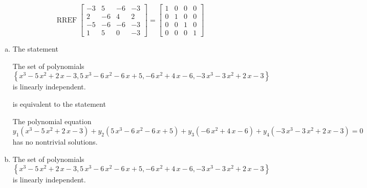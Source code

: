 \begin{exerciseAnswer} 


\[\operatorname{RREF} \left[\begin{array}{cccc}
-3 & 5 & -6 & -3 \\
2 & -6 & 4 & 2 \\
-5 & -6 & -6 & -3 \\
1 & 5 & 0 & -3
\end{array}\right] = \left[\begin{array}{cccc}
1 & 0 & 0 & 0 \\
0 & 1 & 0 & 0 \\
0 & 0 & 1 & 0 \\
0 & 0 & 0 & 1
\end{array}\right] \]


\begin{enumerate}[(a)]
\item The statement 
\begin{center}\begin{minipage}{0.8\textwidth}
 The set of polynomials \( \left\{ x^{3} - 5 \, x^{2} + 2 \, x - 3 , 5 \, x^{3} - 6 \, x^{2} - 6 \, x + 5 , -6 \, x^{2} + 4 \, x - 6 , -3 \, x^{3} - 3 \, x^{2} + 2 \, x - 3 \right\} \) is linearly independent.
\end{minipage}\end{center}
     is equivalent to the statement 
\begin{center}\begin{minipage}{0.8\textwidth}
 The polynomial equation \[ y_{1} \left( x^{3} - 5 \, x^{2} + 2 \, x - 3 \right) + y_{2} \left( 5 \, x^{3} - 6 \, x^{2} - 6 \, x + 5 \right) + y_{3} \left( -6 \, x^{2} + 4 \, x - 6 \right) + y_{4} \left( -3 \, x^{3} - 3 \, x^{2} + 2 \, x - 3 \right) = 0 \] has no nontrivial solutions. 
\end{minipage}\end{center}
    
\item The set of polynomials \( \left\{ x^{3} - 5 \, x^{2} + 2 \, x - 3 , 5 \, x^{3} - 6 \, x^{2} - 6 \, x + 5 , -6 \, x^{2} + 4 \, x - 6 , -3 \, x^{3} - 3 \, x^{2} + 2 \, x - 3 \right\} \)is linearly independent.
\end{enumerate}
    
\end{exerciseAnswer}
    
